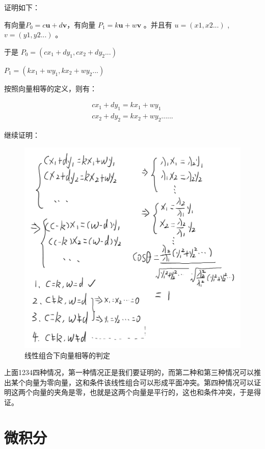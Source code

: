 \documentclass[12pt,oneside]{book}
\begin{document}
证明如下：

有向量$P_0 = c\boldsymbol{u} + d\boldsymbol{v}$，有向量 $P_1 = k\boldsymbol{u} + w\boldsymbol{v}$ 。并且有 $u = (x1, x2...)$ , $v = (y1, y2...)$ 。

于是
$P_0 = (cx_1+dy_1, cx_2+dy_2...)$

$P_1 = (kx_1+wy_1, kx_2+wy_2...)$

按照向量相等的定义，则有：


\begin{align*}
cx_1+dy_1 = kx_1 + wy_1\\
cx_2+dy_2 = kx_2 + wy_2
......
\end{align*}

继续证明：
\begin{figure}[H]
\centering
\includegraphics[width=\linewidth ,totalheight=0.95\textheight , keepaspectratio]{线性组合下向量相等的判定.png}
\caption{线性组合下向量相等的判定}
\end{figure}

上面1234四种情况，第一种情况正是我们要证明的，而第二种和第三种情况可以推出某个向量为零向量，这和条件该线性组合可以形成平面冲突。第四种情况可以证明这两个向量的夹角是零，也就是这两个向量是平行的，这也和条件冲突，于是得证。




\part{微积分}
\end{document}
